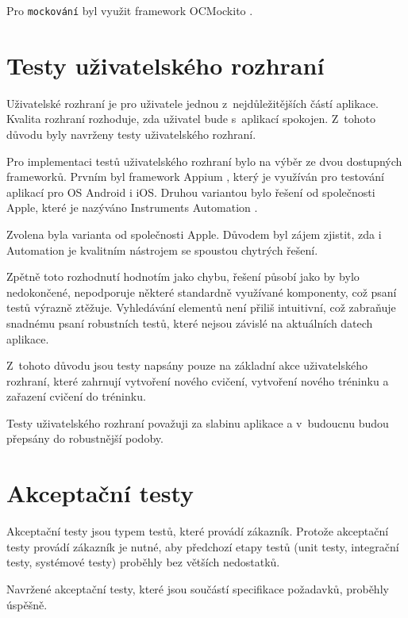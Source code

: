 \documentclass[thesis=B,czech]{FITthesis}[2012/06/26]
\begin{document}
	Pro \texttt{mockování} byl využit framework OCMockito \cite{mockitoOnline}.

\section{Testy uživatelského rozhraní}

	Uživatelské rozhraní je pro uživatele jednou z~nejdůležitějších částí aplikace. Kvalita rozhraní rozhoduje, zda uživatel bude s~aplikací spokojen. Z~tohoto důvodu byly navrženy testy uživatelského rozhraní.

	Pro implementaci testů uživatelského rozhraní bylo na výběr ze dvou dostupných frameworků. Prvním byl framework Appium \cite{appiumOnline}, který je využíván pro testování aplikací pro OS Android i iOS. Druhou variantou bylo řešení od společnosti Apple, které je nazýváno Instruments Automation \cite{automationOnline}.

	Zvolena byla varianta od společnosti Apple. Důvodem byl zájem zjistit, zda i Automation je kvalitním nástrojem se spoustou chytrých řešení.

	Zpětně toto rozhodnutí hodnotím jako chybu, řešení působí jako by bylo nedokončené, nepodporuje některé standardně využívané komponenty, což psaní testů výrazně ztěžuje. Vyhledávání elementů není přiliš intuitivní, což zabraňuje snadnému psaní robustních testů, které nejsou závislé na aktuálních datech aplikace.

	Z~tohoto důvodu jsou testy napsány pouze na základní akce uživatelského rozhraní, které zahrnují vytvoření nového cvičení, vytvoření nového tréninku a zařazení cvičení do tréninku.

	Testy uživatelského rozhraní považuji za slabinu aplikace a v~budoucnu budou přepsány do robustnější podoby.

\section{Akceptační testy}

	Akceptační testy jsou typem testů, které provádí zákazník. Protože akceptační testy provádí zákazník je nutné, aby předchozí etapy testů (unit testy, integrační testy, systémové testy) proběhly bez větších nedostatků.

	Navržené akceptační testy, které jsou součástí specifikace požadavků, proběhly úspěšně.
\end{document}

